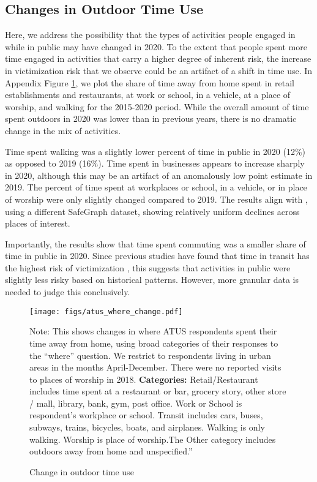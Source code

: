 \subsection{Changes in Outdoor Time Use}
Here, we address the possibility that the types of activities people engaged in while in public may have changed in 2020. To the extent that people spent more time engaged in activities that carry a higher degree of inherent risk, the increase in victimization risk that we observe could be an artifact of a shift in time use. In Appendix Figure \ref{fig:atus_where}, we plot the share of time away from home spent in retail establishments and restaurants, at work or school, in a vehicle, at a place of worship, and walking for the 2015-2020 period. While the overall amount of time spent outdoors in 2020 was lower than in previous years, there is no dramatic change in the mix of activities. 

Time spent walking was a slightly lower percent of time in public in 2020 (12\%) as opposed to 2019 (16\%). Time spent in businesses appears to increase sharply in 2020, although this may be an artifact of an anomalously low point estimate in 2019. The percent of time spent at workplaces or school, in a vehicle, or in place of worship were only slightly changed compared to 2019. The results align with \citet{jay2020neighbourhood}, using a different SafeGraph dataset, showing relatively uniform declines across places of interest. 

Importantly, the results show that time spent commuting was a smaller share of time in public in 2020. Since previous studies have found that time in transit has the highest risk of victimization \citep{vaughan2021promise, lemieux2012risk}, this suggests that activities in public were slightly less risky based on historical patterns. However, more granular data is needed to judge this conclusively.

\begin{figure}
\begin{center}
\texttt{[image: figs/atus\_where\_change.pdf]}
\caption{Change in outdoor time use}
\label{fig:atus_where}
\end{center}
        \vspace*{0mm} 
Note: This shows changes in where ATUS respondents spent their time away from home, using broad categories of their responses to the ``where'' question. We restrict to respondents living in urban areas in the months April-December. There were no reported visits to places of worship in 2018. \textbf{Categories:} Retail/Restaurant includes time spent at a restaurant or bar, grocery story, other store / mall, library, bank, gym, post office. Work or School is respondent's workplace or school. Transit includes cars, buses, subways, trains, bicycles, boats, and airplanes. Walking is only walking. Worship is place of worship.The Other category includes outdoors away from home and unspecified.'' 
\end{figure}

